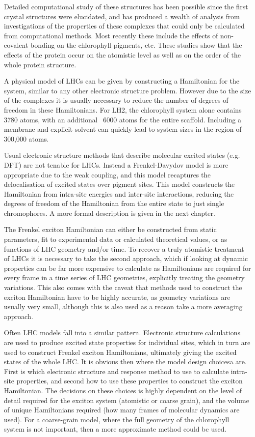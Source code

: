 Detailed computational study of these structures has been possible since the first
crystal structures were elucidated, and has produced a wealth of analysis from investigations
of the properties of these complexes that could only be calculated from computational
methods. Most recently these include the effects of non-covalent bonding on the 
chlorophyll pigments, etc. These studies show that the effects of the protein occur
on the atomistic level as well as on the order of the whole protein structure.

A physical model of LHCs can be given by constructing a Hamiltonian for the system,
similar to any other electronic structure problem. However due to the size of the
complexes it is usually necessary to reduce the number of degrees of freedom in
these Hamiltonians. For LH2, the chlorophyll system alone contains 3780 atoms, with
an additional ~6000 atoms for the entire scaffold. Including a membrane and explicit
solvent can quickly lead to system sizes in the region of 300,000 atoms.

Usual electronic structure methods that describe molecular excited states (e.g. 
DFT) are not tenable for LHCs. Instead a Frenkel-Davydov model is more appropriate
due to the weak coupling, and this model recaptures the delocalisation of excited
states over pigment sites. This model constructs the Hamiltonian from intra-site 
energies and inter-site interactions, reducing the degrees of freedom of the Hamiltonian
from the entire state to just single chromophores. A more formal description is 
given in the next chapter.

The Frenkel exciton Hamiltonian can either be constructed from static parameters,
fit to experimental data or calculated theoretical values, or as functions of LHC 
geometry and/or time. To recover a truly atomistic treatment of LHCs it is necessary 
to take the second approach, which if looking at dynamic properties can be far more
expensive to calculate as Hamiltonians are required for every frame in a time series 
of LHC geometries, explicitly treating the geometry variations. This also comes 
with the caveat that methods used to construct the exciton Hamiltonian have to be
highly accurate, as geometry variations are usually very small, although this is
also used as a reason take a more averaging approach.

Often LHC models fall into a similar pattern. Electronic structure calculations
are used to produce excited state properties for individual sites, which in turn 
are used to construct Frenkel exciton Hamiltonians, ultimately giving the excited 
states of the whole LHC. It is obvious then where the model design choicesa are. 
First is which electronic structure and response method to use to calculate intra-
site properties, and second how to use these properties to construct the exciton 
Hamiltonian. The decisions on these choices is highly dependent on the level of 
detail required for the exciton system (atomistic or coarse grain), and the volume
of unique Hamiltonians required (how many frames of molecular dynamics are used).
For a coarse-grain model, where the full geometry of the chlorophyll system is not
important, then a more approximate method could be used.

